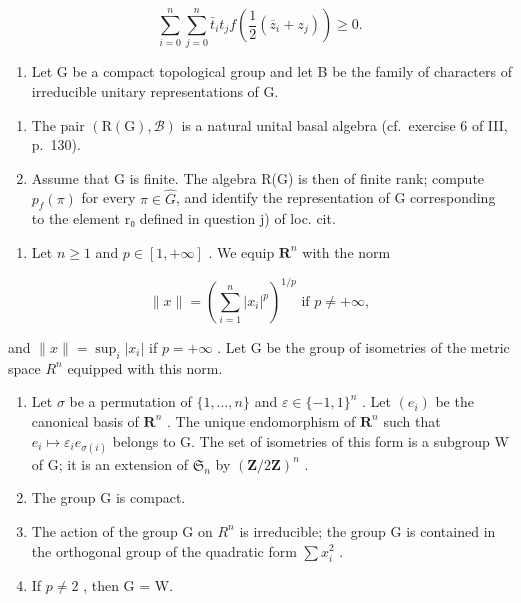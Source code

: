 \[
\sum_ {i = 0} ^ {n} \sum_ {j = 0} ^ {n} \bar {t} _ {i} t _ {j} f \left(\frac {1}{2} (\overline {{z}} _ {i} + z _ {j})\right) \geqslant 0.
\]

\exercisesection{}

\begin{enumerate}
\def\labelenumi{\arabic{enumi})}
\tightlist
\item
  Let G be a compact topological group and let B be the family of characters of irreducible unitary representations of G.
\end{enumerate}

\begin{enumerate}
\def\labelenumi{\alph{enumi})}
\item
  The pair \((\mathrm{R}(\mathrm{G}),\mathcal{B})\) is a natural unital basal algebra (cf.~exercise 6 of III, p.~130).
\item
  Assume that G is finite. The algebra R(G) is then of finite rank; compute \(p_f(\pi)\) for every \(\pi \in \widehat{G}\), and identify the representation of G corresponding to the element r₀ defined in question j) of loc. cit.
\end{enumerate}

\begin{enumerate}
\def\labelenumi{\arabic{enumi})}
\setcounter{enumi}{1}
\tightlist
\item
  Let \(n \geqslant 1\) and \(p \in [1, +\infty]\) . We equip \(\mathbf{R}^n\) with the norm
\end{enumerate}

\[
\| x \| = \left(\sum_ {i = 1} ^ {n} | x _ {i} | ^ {p}\right) ^ {1 / p} \text {   if   } p \neq + \infty ,
\]

and \(\|x\| = \sup_{i}|x_{i}|\) if \(p = +\infty\) . Let G be the group of isometries of the metric space \(R^{n}\) equipped with this norm.

\begin{enumerate}
\def\labelenumi{\alph{enumi})}
\item
  Let \(\sigma\) be a permutation of \(\{1,\ldots,n\}\) and \(\varepsilon\in\{-1,1\}^{n}\) . Let \((e_{i})\) be the canonical basis of \(\mathbf{R}^{n}\) . The unique endomorphism of \(\mathbf{R}^{n}\) such that \(e_{i}\mapsto\varepsilon_{i}e_{\sigma(i)}\) belongs to G. The set of isometries of this form is a subgroup W of G; it is an extension of \(\mathfrak{S}_{n}\) by \((\mathbf{Z}/2\mathbf{Z})^{n}\) .
\item
  The group G is compact.
\item
  The action of the group G on \(R^{n}\) is irreducible; the group G is contained in the orthogonal group of the quadratic form \(\sum x_{i}^{2}\) .
\item
  If \(p \neq 2\) , then G = W.
\end{enumerate}

